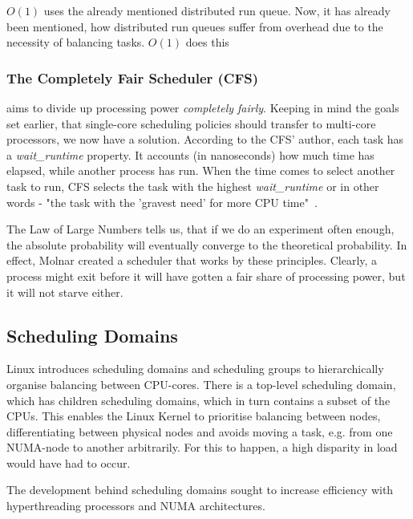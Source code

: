 \documentclass[runningheads]{llncs}
\begin{document}
$O(1)$ uses the already mentioned distributed run queue. Now, it has already been mentioned, how distributed run queues suffer from overhead due to the necessity of balancing tasks. $O(1)$ does this 

\subsubsection{The Completely Fair Scheduler (CFS)} aims to divide up processing power \textit{completely fairly}. Keeping in mind the goals set earlier, that single-core scheduling policies should transfer to multi-core processors, we now have a solution. According to the CFS' author, each task has a \emph{wait\_runtime} property. It accounts (in nanoseconds) how much time has elapsed, while another process has run. When the time comes to select another task to run, CFS selects the task with the highest \emph{wait\_runtime} or in other words - "the task with the 'gravest need' for more CPU time"~\cite{molnar-on-cfs-redhat-forum}.~\cite{molnar-on-cfs-redhat-forum,linux-journal-cfs,ostep,meehean} 

The Law of Large Numbers tells us, that if we do an experiment often enough, the absolute probability will eventually converge to the theoretical probability. In effect, Molnar created a scheduler that works by these principles. Clearly, a process might exit before it will have gotten a fair share of processing power, but it will not starve either.

\subsection{Scheduling Domains}
Linux introduces scheduling domains and scheduling groups to hierarchically organise balancing between CPU-cores. There is a top-level scheduling domain, which has children scheduling domains, which in turn contains a subset of the CPUs.
This enables the Linux Kernel to prioritise balancing between nodes, differentiating between physical nodes and avoids moving a task, e.g. from one NUMA-node to another arbitrarily. For this to happen, a high disparity in load would have had to occur.~\cite{understanding-linux}

The development behind scheduling domains sought to increase efficiency with hyperthreading processors and NUMA architectures.~\cite{lwn-kernel-dev}
\end{document}
